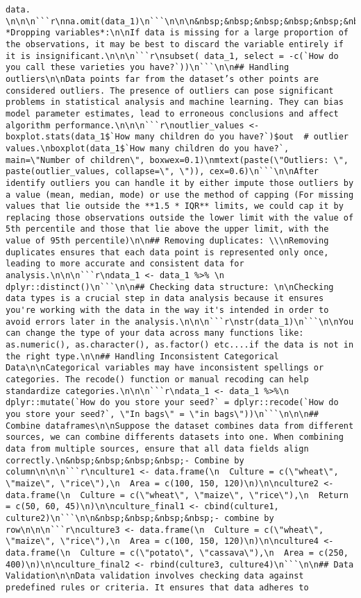 \documentclass[
]{book}
\begin{document}
\begin{verbatim}
data. \n\n\n```r\nna.omit(data_1)\n```\n\n\n&nbsp;&nbsp;&nbsp;&nbsp;&nbsp;&nbsp;&nbsp;&nbsp;- *Dropping variables*:\n\nIf data is missing for a large proportion of the observations, it may be best to discard the variable entirely if it is insignificant.\n\n\n```r\nsubset( data_1, select = -c(`How do you call these varieties you have?`))\n```\n\n## Handling outliers\n\nData points far from the dataset’s other points are considered outliers. The presence of outliers can pose significant problems in statistical analysis and machine learning. They can bias model parameter estimates, lead to erroneous conclusions and affect algorithm performance.\n\n\n```r\noutlier_values <- boxplot.stats(data_1$`How many children do you have?`)$out  # outlier values.\nboxplot(data_1$`How many children do you have?`, main=\"Number of children\", boxwex=0.1)\nmtext(paste(\"Outliers: \", paste(outlier_values, collapse=\", \")), cex=0.6)\n```\n\nAfter identify outliers you can handle it by either impute those outliers by a value (mean, median, mode) or use the method of capping (For missing values that lie outside the **1.5 * IQR** limits, we could cap it by replacing those observations outside the lower limit with the value of 5th percentile and those that lie above the upper limit, with the value of 95th percentile)\n\n## Removing duplicates: \\\nRemoving duplicates ensures that each data point is represented only once, leading to more accurate and consistent data for analysis.\n\n\n```r\ndata_1 <- data_1 %>% \n  dplyr::distinct()\n```\n\n## Checking data structure: \n\nChecking data types is a crucial step in data analysis because it ensures you're working with the data in the way it's intended in order to avoid errors later in the analysis.\n\n\n```r\nstr(data_1)\n```\n\nYou can change the type of your data across many functions like: as.numeric(), as.character(), as.factor() etc....if the data is not in the right type.\n\n## Handling Inconsistent Categorical Data\n\nCategorical variables may have inconsistent spellings or categories. The recode() function or manual recoding can help standardize categories.\n\n\n```r\ndata_1 <- data_1 %>%\n  dplyr::mutate(`How do you store your seed?` = dplyr::recode(`How do you store your seed?`, \"In bags\" = \"in bags\"))\n```\n\n\n## Combine dataframes\n\nSuppose the dataset combines data from different sources, we can combine differents datasets into one. When combining data from multiple sources, ensure that all data fields align correctly.\n&nbsp;&nbsp;&nbsp;&nbsp;- Combine by column\n\n\n```r\nculture1 <- data.frame(\n  Culture = c(\"wheat\", \"maize\", \"rice\"),\n  Area = c(100, 150, 120)\n)\n\nculture2 <- data.frame(\n  Culture = c(\"wheat\", \"maize\", \"rice\"),\n  Return = c(50, 60, 45)\n)\n\nculture_final1 <- cbind(culture1, culture2)\n```\n\n&nbsp;&nbsp;&nbsp;&nbsp;- combine by row\n\n\n```r\nculture3 <- data.frame(\n  Culture = c(\"wheat\", \"maize\", \"rice\"),\n  Area = c(100, 150, 120)\n)\n\nculture4 <- data.frame(\n  Culture = c(\"potato\", \"cassava\"),\n  Area = c(250, 400)\n)\n\nculture_final2 <- rbind(culture3, culture4)\n```\n\n## Data Validation\n\nData validation involves checking data against predefined rules or criteria. It ensures that data adheres to 
\end{verbatim}
\end{document}
